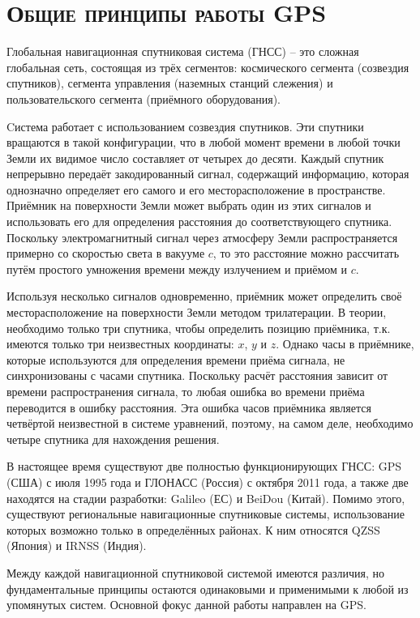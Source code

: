 \chapter{\textsc{Общие принципы работы GPS}}

Глобальная навигационная спутниковая система (ГНСС) -- это сложная глобальная сеть, состоящая из трёх сегментов: космического сегмента (созвездия спутников), сегмента управления (наземных станций слежения) и пользовательского сегмента (приёмного оборудования).

Cистема работает с использованием созвездия спутников.  
Эти спутники вращаются в такой конфигурации, что в любой момент времени в любой точки Земли их видимое число составляет от четырех до десяти.
Каждый спутник непрерывно передаёт закодированный сигнал, содержащий информацию, которая однозначно определяет его самого и его месторасположение в пространстве. 
Приёмник на поверхности Земли может выбрать один из этих сигналов и использовать его для определения расстояния до соответствующего спутника.  
Поскольку электромагнитный сигнал через атмосферу Земли распространяется примерно со скоростью света в вакууме $c$, то это расстояние можно рассчитать путём простого умножения времени между излучением и приёмом и $c$.

Используя несколько сигналов одновременно, приёмник может определить своё месторасположение на поверхности Земли методом трилатерации.
В теории, необходимо только три спутника, чтобы определить позицию приёмника, т.к. имеются только три неизвестных координаты: $x$, $y$ и $z$.   
Однако часы в приёмнике, которые используются для определения времени приёма сигнала, не синхронизованы с часами спутника.
Поскольку расчёт расстояния зависит от времени распространения сигнала, то любая ошибка во времени приёма переводится в ошибку расстояния.  
Эта ошибка часов приёмника является четвёртой неизвестной в системе уравнений, поэтому, на самом деле, необходимо четыре спутника для нахождения решения.

В настоящее время существуют две полностью функционирующих ГНСС: GPS (США) с июля 1995 года и ГЛОНАСС (Россия) с октября 2011 года, а также две находятся на стадии разработки: Galileo (ЕС) и BeiDou (Китай). 
Помимо этого, существуют региональные навигационные спутниковые системы, использование которых возможно только в определённых районах. 
К ним относятся QZSS (Япония) и IRNSS (Индия).  

Между каждой навигационной спутниковой системой имеются различия, но фундаментальные принципы остаются одинаковыми и применимыми к любой из упомянутых систем.
Основной фокус данной работы направлен на GPS.